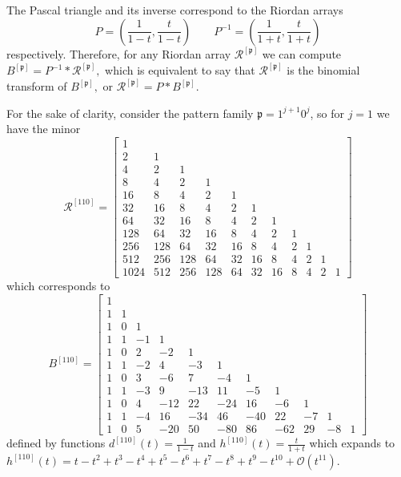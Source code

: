 The Pascal triangle and its inverse correspond to the Riordan arrays $$P
=\left(\frac{1}{1-t},\frac{t}{1-t}\right) \quad\quad
P^{-1}=\left(\frac{1}{1+t},\frac{t}{1+t}\right)$$ respectively.  Therefore, for
any Riordan array $\mathcal{R}^{[\mathfrak{p}]}$ we can compute
$B^{[\mathfrak{p}]}= P^{-1} \ast \mathcal{R}^{[\mathfrak{p}]},$ which is
equivalent to say that  $\mathcal{R}^{[\mathfrak{p}]}$ is the binomial
transform of $B^{[\mathfrak{p}]},$ or $\mathcal{R}^{[\mathfrak{p}]}=P \ast
B^{[\mathfrak{p}]}$.

For the sake of clarity, consider the pattern family $\mathfrak{p}=1^{j+1}0^{j}$,
so for $j=1$ we have the minor
\begin{displaymath}
\mathcal{R}^{[110]} = \left[\begin{array}{ccccccccccc}1 &  &  &  &  &  &  &  &  &  & \\2 & 1 &  &  &  &  &  &  &  &  & \\4 & 2 & 1 &  &  &  &  &  &  &  & \\8 & 4 & 2 & 1 &  &  &  &  &  &  & \\16 & 8 & 4 & 2 & 1 &  &  &  &  &  & \\32 & 16 & 8 & 4 & 2 & 1 &  &  &  &  & \\64 & 32 & 16 & 8 & 4 & 2 & 1 &  &  &  & \\128 & 64 & 32 & 16 & 8 & 4 & 2 & 1 &  &  & \\256 & 128 & 64 & 32 & 16 & 8 & 4 & 2 & 1 &  & \\512 & 256 & 128 & 64 & 32 & 16 & 8 & 4 & 2 & 1 & \\1024 & 512 & 256 & 128 & 64 & 32 & 16 & 8 & 4 & 2 & 1\end{array}\right]
\end{displaymath}
which corresponds to
\begin{displaymath}
B^{[110]} = \left[\begin{array}{ccccccccccc}
1 &  &  &  &  &  &  &  &  &  & \\
1 & 1 &  &  &  &  &  &  &  &  & \\
1 & 0 & 1 &  &  &  &  &  &  &  & \\
1 & 1 & -1 & 1 &  &  &  &  &  &  & \\
1 & 0 & 2 & -2 & 1 &  &  &  &  &  & \\
1 & 1 & -2 & 4 & -3 & 1 &  &  &  &  & \\
1 & 0 & 3 & -6 & 7 & -4 & 1 &  &  &  & \\
1 & 1 & -3 & 9 & -13 & 11 & -5 & 1 &  &  & \\
1 & 0 & 4 & -12 & 22 & -24 & 16 & -6 & 1 &  & \\
1 & 1 & -4 & 16 & -34 & 46 & -40 & 22 & -7 & 1 & \\
1 & 0 & 5 & -20 & 50 & -80 & 86 & -62 & 29 & -8 & 1\end{array}\right]
\end{displaymath}
defined by functions $d^{[110]}(t)=\frac{1}{1-t}$ and
$h^{[110]}(t)=\frac{t}{1+t}$ which expands to $h^{[110]}(t) = t - t^{2} + t^{3} - t^{4} + t^{5} - t^{6} + t^{7} -
t^{8} + t^{9} - t^{10} + \mathcal{O}\left(t^{11}\right)$.

